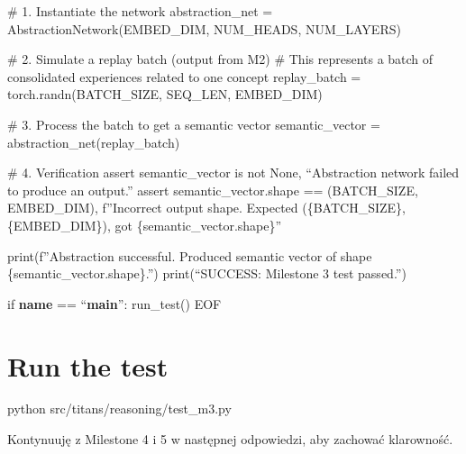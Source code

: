 \documentclass[letterpaper,twocolumn]{article}
\begin{document}
\# 1. Instantiate the network abstraction\_net =
AbstractionNetwork(EMBED\_DIM, NUM\_HEADS, NUM\_LAYERS)

\# 2. Simulate a replay batch (output from M2) \# This represents a
batch of consolidated experiences related to one concept replay\_batch =
torch.randn(BATCH\_SIZE, SEQ\_LEN, EMBED\_DIM)

\# 3. Process the batch to get a semantic vector semantic\_vector =
abstraction\_net(replay\_batch)

\# 4. Verification assert semantic\_vector is not None, ``Abstraction
network failed to produce an output.'' assert semantic\_vector.shape ==
(BATCH\_SIZE, EMBED\_DIM), f''Incorrect output shape. Expected
(\{BATCH\_SIZE\}, \{EMBED\_DIM\}), got \{semantic\_vector.shape\}''

print(f''Abstraction successful. Produced semantic vector of shape
\{semantic\_vector.shape\}.'') print(``SUCCESS: Milestone 3 test
passed.'')

if \textbf{name} == ``\textbf{main}'': run\_test() EOF

\hypertarget{run-the-test-1}{%
\section{Run the test}\label{run-the-test-1}}

python src/titans/reasoning/test\_m3.py

Kontynuuję z Milestone 4 i 5 w następnej odpowiedzi, aby zachować
klarowność.
\end{document}
